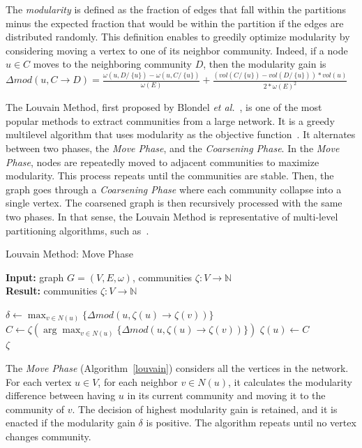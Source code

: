 \documentclass[default,iicol]{sn-jnl}%
\theoremstyle{thmstyleone}%
\theoremstyle{thmstyletwo}%
\theoremstyle{thmstylethree}%
\begin{document}
The \textit{modularity} is defined as the fraction of edges that fall within the partitions 
minus the expected fraction that would be within the partition if the edges are distributed randomly.
This definition enables to greedily optimize modularity by considering moving a vertex to one of its neighbor community. Indeed, if a node $u \in C$ moves to the
neighboring community $D$, then the modularity gain is
$\Delta mod(u, C\rightarrow D) = \frac{\omega(u, D/\ \{u\}) - \omega(u, C/\ \{u\})}{\omega(E)} + \frac{(vol(C/\ \{u\}) - vol(D/\ \{u\}))*vol(u)}{2*\omega(E)^2}$


The Louvain Method, first proposed by Blondel \textit{et al.}~\cite{Vincent}, is one of the most popular methods to extract 
communities from a large network. It is a greedy multilevel algorithm that uses modularity as the objective function~\cite{plm}. 
It alternates between two phases, the \textit{Move Phase}, and the \textit{Coarsening Phase}. In the \textit{Move Phase}, 
nodes are repeatedly moved to adjacent communities to maximize modularity. This process repeats until the 
communities are stable. Then, the graph goes through a \textit{Coarsening Phase} where each community 
collapse into a single vertex. The coarsened graph is then recursively processed with the same two phases. 
In that sense, the Louvain Method is representative of multi-level partitioning algorithms, such as~\cite{Karypis99}.
\begin{algorithm}
  \caption{Louvain Method: Move Phase}\label{louvain}
  \begin{flushleft}
  \textbf{Input: }graph $G=(V, E, \omega)$, communities $\zeta:V\to\mathbb{N}$ \\
  \textbf{Result: }communities $\zeta:V\to\mathbb{N}$
  \end{flushleft}
  \begin{algorithmic}[1]
    \Repeat
        \State $\delta \leftarrow\max_{v\in N(u)}\{\Delta mod(u,\zeta(u)\rightarrow\zeta(v))\}$
        	\State  $C \leftarrow \zeta(\arg\max_{v \in N(u)}\{\Delta mod(u,\zeta(u) \rightarrow \zeta(v))\})$
        	\State $\zeta(u) \leftarrow C$
        \EndIf
      \EndFor
    \\
    \Return $\zeta$
  \end{algorithmic}
\end{algorithm}

The \textit{Move Phase} (Algorithm~\ref{louvain}) considers all the
vertices in the network. For each vertex $u \in V$, for each neighbor
$v \in N(u)$, it calculates the modularity difference between having
$u$ in its current community and moving it to the community of
$v$. The decision of highest modularity gain is retained, and it is
enacted if the modularity gain $\delta$ is positive. The algorithm
repeats until no vertex changes community. 
\end{document}
